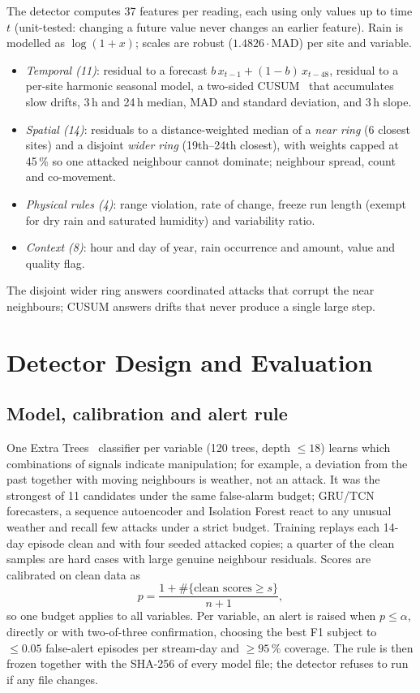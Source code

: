\documentclass[conference]{IEEEtran}
\begin{document}
The detector computes 37 features per reading, each using only values up to time $t$ (unit-tested: changing
a future value never changes an earlier feature). Rain is modelled as $\log(1+x)$; scales are robust
($1.4826\cdot$MAD) per site and variable.
\begin{itemize}
\item \emph{Temporal (11)}: residual to a forecast $b\,x_{t-1}+(1-b)\,x_{t-48}$, residual to a per-site
harmonic seasonal model, a two-sided CUSUM~\cite{cusum} that accumulates slow drifts, 3\,h and 24\,h median, MAD
and standard deviation, and 3\,h slope.
\item \emph{Spatial (14)}: residuals to a distance-weighted median of a \emph{near ring} (6 closest sites)
and a disjoint \emph{wider ring} (19th--24th closest), with weights capped at 45\,\% so one attacked
neighbour cannot dominate; neighbour spread, count and co-movement.
\item \emph{Physical rules (4)}: range violation, rate of change, freeze run length (exempt for dry rain and
saturated humidity) and variability ratio.
\item \emph{Context (8)}: hour and day of year, rain occurrence and amount, value and quality flag.
\end{itemize}
The disjoint wider ring answers coordinated attacks that corrupt the near neighbours; CUSUM answers drifts
that never produce a single large step.

\section{Detector Design and Evaluation}

\subsection{Model, calibration and alert rule}
One Extra Trees~\cite{extratrees} classifier per variable (120 trees, depth $\leq 18$) learns which combinations of signals
indicate manipulation; for example, a deviation from the past together with moving neighbours is weather,
not an attack. It was the strongest of 11 candidates under the same false-alarm budget; GRU/TCN forecasters,
a sequence autoencoder and Isolation Forest react to any unusual weather and recall few attacks under a strict
budget. Training replays each 14-day episode clean and with four seeded attacked copies; a quarter of the
clean samples are hard cases with large genuine neighbour residuals. Scores are calibrated on clean data as
\begin{equation}
p = \frac{1 + \#\{\text{clean scores} \geq s\}}{n + 1},
\label{eq:p}
\end{equation}
so one budget applies to all variables. Per variable, an alert is raised when $p \leq \alpha$, directly or
with two-of-three confirmation, choosing the best F1 subject to $\leq 0.05$ false-alert episodes per
stream-day and $\geq 95\,\%$ coverage. The rule is then frozen together with the SHA-256 of every model file;
the detector refuses to run if any file changes.
\end{document}
